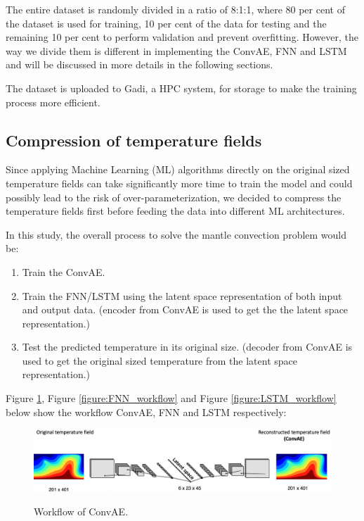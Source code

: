 The entire dataset is randomly divided in a ratio of 8:1:1, where 80 per cent of the dataset is used for training, 10 per cent of the data for testing and the remaining 10 per cent to perform validation and prevent overfitting. However, the way we divide them is different in implementing the ConvAE, FNN and LSTM and will be discussed in more details in the following sections.

The dataset is uploaded to Gadi, a HPC system, for storage to make the training process more efficient. 

\subsection{Compression of temperature fields}

Since applying Machine Learning (ML) algorithms directly on the original sized temperature fields can take significantly more time to train the model and could possibly lead to the risk of over-parameterization, we decided to compress the temperature fields first before feeding the data into different ML architectures.

In this study, the overall process to solve the mantle convection problem would be: 

\begin{enumerate}
  \item Train the ConvAE.
  \item Train the FNN/LSTM using the latent space representation of both input and output data. (encoder from ConvAE is used to get the the latent space representation.)
  \item Test the predicted temperature in its original size. (decoder from ConvAE is used to get the original sized temperature from the latent space representation.)
\end{enumerate}

Figure \ref{figure:ConvAE_workflow}, Figure \ref{figure:FNN_workflow} and Figure \ref{figure:LSTM_workflow} below show the workflow ConvAE, FNN and LSTM respectively:

\begin{figure}[H]
    \centering
    \caption{Workflow of ConvAE.}
    \includegraphics[scale=0.3]{figures/mantle_convection_images/ConvAE_workflow.png}
    \label{figure:ConvAE_workflow}
\end{figure}

